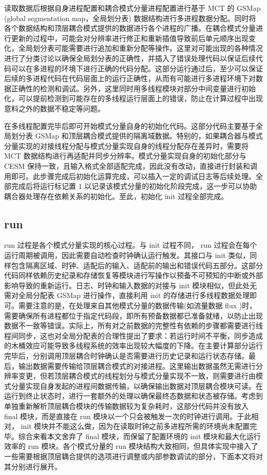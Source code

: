 读取数据后根据自身进程配置和耦合模式分量进程配置进行基于 MCT 的 GSMap (global segmentation map，全局划分表) 数据结构进行多进程数据分配。同时将各个数据结构和顶层耦合模式提供的数据进行各个进程的广播。在耦合模式分量进行更新的过程中，可能会对分辨率进行修正和重新插值导致前后单元顺序出现变化，全局划分表可能需要进行追加和重新分配等操作。这里对可能出现的各种情况进行了分类讨论以确保全局划分表的正确性，并插入了错误处理代码以保证后续代码可以在多进程的环境下进行正确的代码分配。这部分运行通过后，至少可以保证后续的多进程代码在代码层面上的运行正确性，从而有可能进行多进程环境下对数据正确性的检测和调试。另外，这里同时用多线程模块对部分中间变量进行初始化，可以提前检测到可能存在的多线程运行层面上的错误，防止在计算过程中出现意料之外的数据不稳定等问题。

在多线程配置完毕后即可开始模式分量自身的初始化代码。这部分代码主要基于全局划分表 GSMap 和顶层耦合模式提供的隔离域数据。特别的，如果耦合器与模式分量实现的对接线程分配与模式分量实现自身的线程分配存在差异时，需要将 MCT 数据结构进行再适配并同步分辨率。模式分量实现自身的初始化部分与 CESM 保持一致，且输入格式全部适配完成，因此没有改动，直接进行封装和调用即可。此步骤完成后初始化运算完成，可以插入一定的调试日志等后续处理。全部完成后将运行标记置 1 以记录该模式分量的初始化阶段完成，这一步可以协助耦合器处理存在依赖关系的初始化。至此，初始化 init 过程全部完成。

\subsection{run}

run 过程是各个模式分量实现的核心过程。与 init 过程不同， run 过程会在每个运行周期被调用，因此需要自动检查时钟确认运行触发。其接口与 init 类似，同样包含隔离区域、时钟、适配后的输入、适配前的输出和错误代码五部分。这部分代码同样依赖历史纪录和存储恢复等模块进行写操作以预备不可预知的中断或外部影响导致的重新运行。日志、时钟和输入数据的对接与 init 模块相似，但此处无需对全局分配表 GSMap 进行操作，直接利用 init 的存储进行多线程数据处理即可。需要注意的是，在处理来自其他模式分量的数据传输(如流量数据 flux )时，需要确保所有进程都位于指定代码段，即所有预备数据都已准备就绪，以防止出现数据不一致等错误。实际上，所有对之前数据的完整性有依赖的步骤都需要进行线程间同步，这也对全局分配表的合理性提出了要求：若运行时间不平衡，同步造成的木桶效应可能导致多线程系统的效率出现较大幅度的下降。在主要计算部分运行完毕后，分别调用顶层耦合时钟确认是否需要进行历史记录和运行状态存储。最后，输出数据需要传输给顶层耦合模式的对接进程。这里输出数据虽然无需进行分辨率变更，但若顶层耦合模式的线程划分与模式分量实现不一致，则需要进行由模式分量实现自身发起的进程间数据传输，以确保输出数据对顶层耦合模块可读。在运行到终止状态时，进行一套额外的处理以确保最终态数据和状态被存储。考虑到单独重新解析顶层耦合模块的传输数据较为复杂耗时，这部分代码并没有放入 final 模块，而是直接在 run 模块以一个只会被触发一次的时钟进行调用。于此相对， init 模块并不能这么做，因为在读取时钟之前多进程所需的环境尚未配置完毕。综合来看本文舍弃了 final 模块，而保留了配置环境的 init 模块和最大化运行效率的 run 模块。各个模式分量的 run 模块结构大致相同，但具体实现中接入了一些需要根据顶层耦合提供的选项进行调整或内部参数调试的部分，下面本文将对其分别进行展开。

